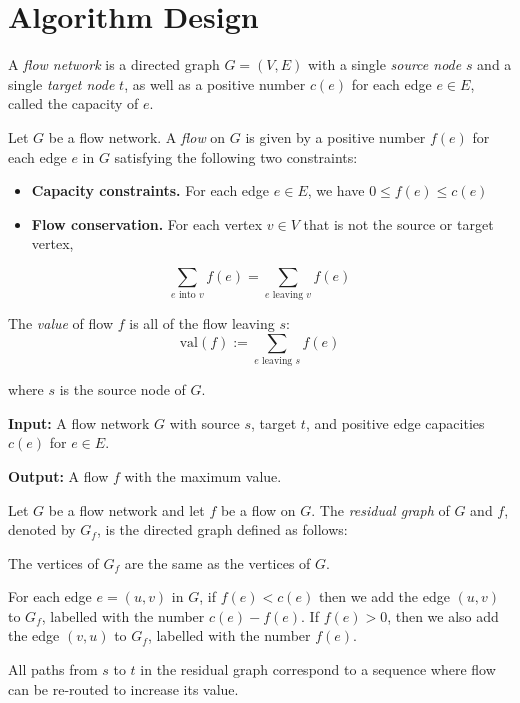 
\section{Algorithm Design}\label{41ab460}


A \textit{flow network} is a directed graph $G=(V,E)$ with a single
\textit{source node} $s$ and a single \textit{target node} $t$, as
well as a positive number $c(e)$ for each edge $e\in E$, called the
capacity of $e$.


Let $G$ be a flow network. A \textit{flow} on $G$ is given by a positive
number $f(e)$ for each edge $e$ in $G$ satisfying the following two
constraints:
\begin{itemize}
	\item \textbf{Capacity constraints.} For each edge $e\in E$, we have
	      $0\leq f(e)\leq c(e)$
	\item \textbf{Flow conservation.} For each vertex $v\in V$ that is
	      not the source or target vertex,
\end{itemize}
$$
	\sum_{e\text{ into }v}f(e)=\sum_{e\text{ leaving }v}f(e)
$$

The \textit{value} of flow $f$ is all of the flow leaving $s$:
$$
	\text{val}(f):=\sum_{e\text{ leaving }s}f(e)
$$

where $s$ is the source node of $G$.


\textbf{Input:} A flow network $G$ with source $s$, target $t$, and positive
edge capacities $c(e)$ for $e\in E$.

\textbf{Output:} A flow $f$ with the maximum value.


Let $G$ be a flow network and let $f$ be a flow on $G$. The
\textit{residual graph} of $G$ and $f$, denoted by $G_f$, is the
directed graph defined as follows:

The vertices of $G_f$ are the same as the vertices of $G$.

For each edge $e=(u,v)$ in $G$, if $f(e)<c(e)$ then we add the edge
$(u,v)$ to $G_f$, labelled with the number $c(e)-f(e)$. If $f(e)>0$,
then we also add the edge $(v,u)$ to $G_f$, labelled with the number
$f(e)$.

All paths from $s$ to $t$ in the residual graph correspond to a
sequence where flow can be re-routed to increase its value.

